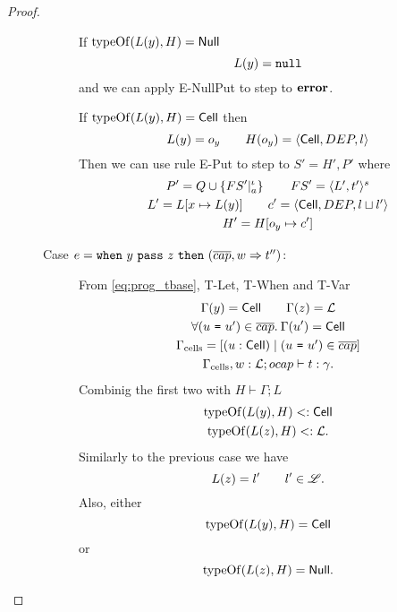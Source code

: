 \begin{proof}
\begin{description}
\begin{description}
          If $\mbox{$\mathrm{typeOf}$}(L(y), H) = \mbox{$\mathsf{Null}$}$
          \begin{equation*}
            L(y) = \mbox{\mdseries\texttt{null}}
          \end{equation*}
          and we can apply {\sc E-NullPut} to step to $\mbox{{\bf error}}$. \contradiction

          If $\mbox{$\mathrm{typeOf}$}(L(y), H) = \mbox{$\mathsf{Cell}$}$ then 
          \begin{equation*}
            L(y) = o_y \quad\quad H(o_y) = \mbox{$\langle \mbox{$\mathsf{Cell}$}{}, DEP, l \rangle$}
          \end{equation*}
          Then we can use rule {\sc E-Put} to step to $S' = H', P'$ where 
          \begin{equation*}
            \begin{gathered}
              P' = Q \cup \left\{FS'|_a^\iota \right\} \quad\quad FS' = \mbox{$\langle L',
              t' \rangle^s$} \\
              L' = L[x \mapsto L(y)] \quad\quad c' = \mbox{$\langle \mbox{$\mathsf{Cell}$}{}, DEP, l \sqcup l' \rangle$} \\
              H' = H[o_y \mapsto c']
            \end{gathered}
          \end{equation*}
          \contradiction

        \item[Case $e = \mbox{\mdseries\texttt{when}~$y$~\texttt{pass}~$z$~\texttt{then}~$(\overline{cap}, w \Rightarrow t'')$}$:]
          From \eqref{eq:prog_tbase}, {\sc T-Let}, {\sc T-When} and {\sc T-Var}
          \begin{equation*}
            \begin{gathered}
              \Gamma(y) = \mbox{$\mathsf{Cell}$} \quad\quad \Gamma(z) = \mbox{$\mathcal{L}$} \\
              \forall(\mbox{\mdseries$u$~\texttt{=}~$u'$}) \in \overline{cap}. \: \Gamma(u') = \mbox{$\mathsf{Cell}$} \\
              \Gamma_{\text{cells}} = [(u: \mbox{$\mathsf{Cell}$}) \mid (\mbox{\mdseries$u$~\texttt{=}~$u'$}) \in
              \overline{cap}] \\
              \mbox{$\Gamma_{\text{cells}}, w: \mbox{$\mathcal{L}$};\mbox{$ocap$}\vdash t:\gamma$}.
            \end{gathered}
          \end{equation*}
          Combinig the first two with $H \vdash \Gamma;L$
          \begin{gather*}
            \mbox{$\mathrm{typeOf}$}(L(y), H) <: \mbox{$\mathsf{Cell}$} \\
            \mbox{$\mathrm{typeOf}$}(L(z), H) <: \mbox{$\mathcal{L}$}.
          \end{gather*}
          Similarly to the previous case we have
          \begin{equation*}
            L(z) = l' \quad\quad l' \in \mbox{$\mathscr{L}$}.
          \end{equation*}
          Also, either
          \begin{equation*}
            \mbox{$\mathrm{typeOf}$}(L(y), H) = \mbox{$\mathsf{Cell}$}
          \end{equation*}
          or
          \begin{equation*}
            \mbox{$\mathrm{typeOf}$}(L(z), H) = \mbox{$\mathsf{Null}$}.
          \end{equation*}


\end{description}
\end{description}
\end{proof}
